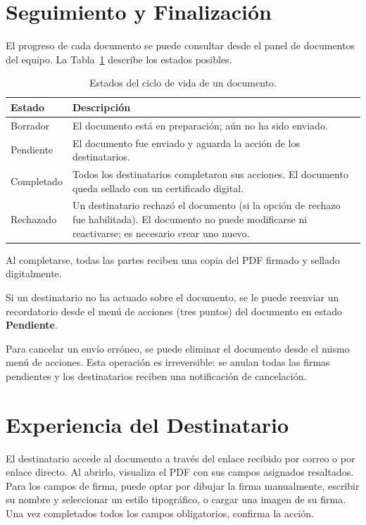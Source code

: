 \section{Seguimiento y Finalización}
\label{AppendixD:Seguimiento}

El progreso de cada documento se puede consultar desde el panel de documentos del equipo. La Tabla~\ref{tab:apD_estados} describe los estados posibles.

\begin{table}[H]
\centering
\caption{Estados del ciclo de vida de un documento.}
\label{tab:apD_estados}
\begin{tabular}{l p{10cm}}
\hline
\textbf{Estado} & \textbf{Descripción} \\
\hline
Borrador    & El documento está en preparación; aún no ha sido enviado. \\
Pendiente   & El documento fue enviado y aguarda la acción de los destinatarios. \\
Completado  & Todos los destinatarios completaron sus acciones. El documento queda sellado con un certificado digital. \\
Rechazado   & Un destinatario rechazó el documento (si la opción de rechazo fue habilitada). El documento no puede modificarse ni reactivarse; es necesario crear uno nuevo. \\
\hline
\end{tabular}
\end{table}

Al completarse, todas las partes reciben una copia del PDF firmado y sellado digitalmente.

Si un destinatario no ha actuado sobre el documento, se le puede reenviar un recordatorio desde el menú de acciones (tres puntos) del documento en estado \textbf{Pendiente}.

Para cancelar un envío erróneo, se puede eliminar el documento desde el mismo menú de acciones. Esta operación es irreversible: se anulan todas las firmas pendientes y los destinatarios reciben una notificación de cancelación.


\section{Experiencia del Destinatario}
\label{AppendixD:Destinatario}

El destinatario accede al documento a través del enlace recibido por correo o por enlace directo. Al abrirlo, visualiza el PDF con sus campos asignados resaltados. Para los campos de firma, puede optar por dibujar la firma manualmente, escribir su nombre y seleccionar un estilo tipográfico, o cargar una imagen de su firma. Una vez completados todos los campos obligatorios, confirma la acción.

